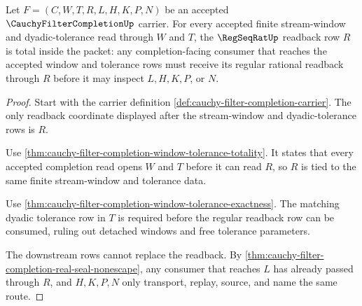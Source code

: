 \begin{theorem}
\label{thm:cauchy-filter-completion-regular-readback-completeness}
Let $F=(C,W,T,R,L,H,K,P,N)$ be an accepted $\CauchyFilterCompletionUp$ carrier. For every accepted finite stream-window and dyadic-tolerance read through $W$ and $T$, the $\RegSeqRatUp$ readback row $R$ is total inside the packet: any completion-facing consumer that reaches the accepted window and tolerance rows must receive its regular rational readback through $R$ before it may inspect $L,H,K,P$, or $N$.
\end{theorem}
\begin{proof}
Start with the carrier definition \autoref{def:cauchy-filter-completion-carrier}. The only readback coordinate displayed after the stream-window and dyadic-tolerance rows is $R$.

Use \autoref{thm:cauchy-filter-completion-window-tolerance-totality}. It states that every accepted completion read opens $W$ and $T$ before it can read $R$, so $R$ is tied to the same finite stream-window and tolerance data.

Use \autoref{thm:cauchy-filter-completion-window-tolerance-exactness}. The matching dyadic tolerance row in $T$ is required before the regular readback row can be consumed, ruling out detached windows and free tolerance parameters.

The downstream rows cannot replace the readback. By \autoref{thm:cauchy-filter-completion-real-seal-nonescape}, any consumer that reaches $L$ has already passed through $R$, and $H,K,P,N$ only transport, replay, source, and name the same route.
\end{proof}

